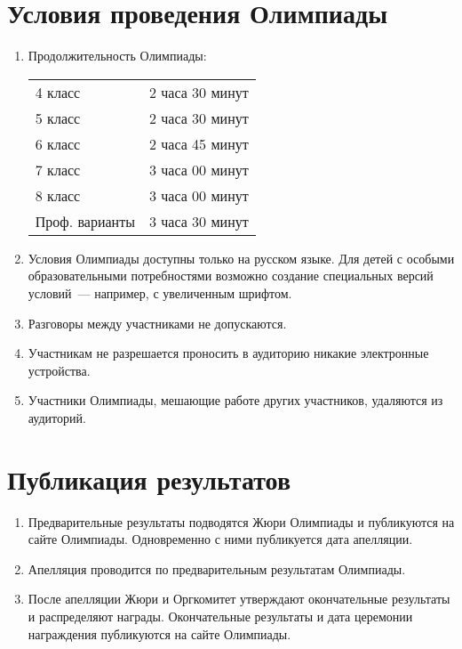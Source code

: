 \documentclass[a4paper,12pt]{article}
\begin{document}
\section{Условия проведения Олимпиады}

\begin{enumerate}
	\item Продолжительность Олимпиады: \begin{center} \begin{tabular}{ll}
		4 класс & 2 часа 30 минут \\
		5 класс & 2 часа 30 минут \\
		6 класс & 2 часа 45 минут \\
		7 класс & 3 часа 00 минут \\
		8 класс & 3 часа 00 минут \\
		Проф. варианты & 3 часа 30 минут \\
	\end{tabular} \end{center}
	\item Условия Олимпиады доступны только на русском языке. Для детей с особыми образовательными потребностями возможно создание специальных версий условий~— например, с увеличенным шрифтом.
	\item Разговоры между участниками не допускаются.
	\item Участникам не разрешается проносить в аудиторию никакие электронные устройства.
	\item Участники Олимпиады, мешающие работе других участников, удаляются из аудиторий.
\end{enumerate}

\section{Публикация результатов}

\begin{enumerate}
	\item Предварительные результаты подводятся Жюри Олимпиады и публикуются на сайте Олимпиады. Одновременно с ними публикуется дата апелляции. 
	\item Апелляция проводится по предварительным результатам Олимпиады.
	\item После апелляции Жюри и Оргкомитет утверждают окончательные результаты и распределяют награды. Окончательные результаты и дата церемонии награждения публикуются на сайте Олимпиады.
\end{enumerate}
\end{document}
